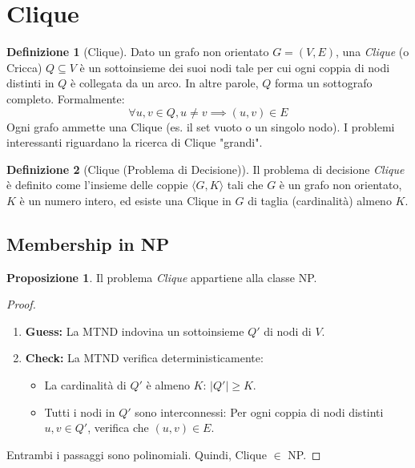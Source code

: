 \documentclass[a4paper]{article}
\theoremstyle{definition} %
\newtheorem{definition}{Definizione}[section]
\newtheorem{proposition}{Proposizione}[section]
\theoremstyle{definition} %
\begin{document}
\section{Clique}

\begin{definition}[Clique]
Dato un grafo non orientato $G=(V, E)$, una \emph{Clique} (o Cricca) $Q \subseteq V$ è un sottoinsieme dei suoi nodi tale per cui ogni coppia di nodi distinti in $Q$ è collegata da un arco. In altre parole, $Q$ forma un sottografo completo. Formalmente:
\[ \forall u, v \in Q, u \ne v \implies (u, v) \in E \]
Ogni grafo ammette una Clique (es. il set vuoto o un singolo nodo). I problemi interessanti riguardano la ricerca di Clique "grandi".
\end{definition}

\begin{definition}[Clique (Problema di Decisione)]
Il problema di decisione \emph{Clique} è definito come l'insieme delle coppie $\langle G, K \rangle$ tali che $G$ è un grafo non orientato, $K$ è un numero intero, ed esiste una Clique in $G$ di taglia (cardinalità) almeno $K$.
\end{definition}

\subsection{Membership in NP}

\begin{proposition}
Il problema \emph{Clique} appartiene alla classe NP.
\end{proposition}

\begin{proof}
\begin{enumerate}
    \item \textbf{Guess:} La MTND indovina un sottoinsieme $Q'$ di nodi di $V$.
    \item \textbf{Check:} La MTND verifica deterministicamente:
    \begin{itemize}
        \item La cardinalità di $Q'$ è almeno $K$: $|Q'| \ge K$.
        \item Tutti i nodi in $Q'$ sono interconnessi: Per ogni coppia di nodi distinti $u, v \in Q'$, verifica che $(u, v) \in E$.
    \end{itemize}
\end{enumerate}
Entrambi i passaggi sono polinomiali. Quindi, Clique $\in$ NP.
\end{proof}
\end{document}
